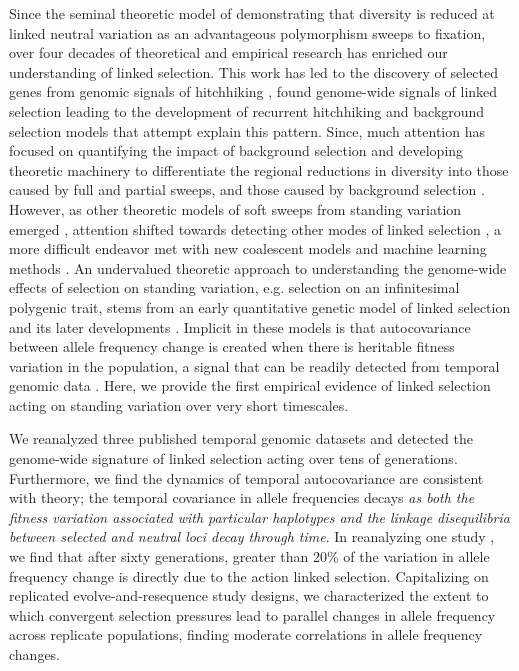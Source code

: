 \documentclass[11pt]{article}
\newcommand{\vb}[1]{{\it \color{blue} #1}}
\begin{document}
Since the seminal theoretic model of \textcite{Maynard_Smith1974-lc}
demonstrating that diversity is reduced at linked neutral variation as an
advantageous polymorphism sweeps to fixation, over four decades of theoretical
and empirical research has enriched our understanding of linked selection. This
work has led to the discovery of selected genes from genomic signals of
hitchhiking \parencite{Nair2003-tw,Voight2006-rn}, found genome-wide signals of
linked selection
\parencite{Aguade1989-jx,Begun1992-ey,Cutter2010-gi,Andersen2012-bj,Cutter2003-tl}
leading to the development of recurrent hitchhiking \parencite{Stephan1992-jc}
and background selection \parencite{Charlesworth1993-gb} models that attempt
explain this pattern. Since, much attention has focused on quantifying the
impact of background selection \parencite{McVicker2009-ax} and developing
theoretic machinery \parencite{Coop2012-cd} to differentiate the regional
reductions in diversity into those caused by full and partial sweeps, and those
caused by background selection \parencite{Elyashiv2016-vt}. However, as other
theoretic models of soft sweeps from standing variation emerged
\parencite{Hermisson2005-hs,Pennings2006-lj}, attention shifted towards
detecting other modes of linked selection \parencite{Pritchard2010-tk}, a more
difficult endeavor \parencite{Przeworski2005-bg} met with new coalescent models
\parencite{Berg2015-xj} and machine learning methods
\parencite{Schrider2017-yx}. An undervalued theoretic approach to understanding
the genome-wide effects of selection on standing variation, e.g. selection on
an infinitesimal polygenic trait, stems from an early quantitative genetic
model of linked selection \parencite{Robertson1961-ho} and its later
developments \parencite{Santiago1995-hx,Santiago1998-bs}. Implicit in these
models is that autocovariance between allele frequency change is created when
there is heritable fitness variation in the population, a signal that can be
readily detected from temporal genomic data \parencite{Buffalo2019-io}. Here,
we provide the first empirical evidence of linked selection acting on standing
variation over very short timescales.

We reanalyzed three published temporal genomic datasets and detected the
genome-wide signature of linked selection acting over tens of generations.
Furthermore, we find the dynamics of temporal autocovariance are consistent
with theory; the temporal covariance in allele frequencies decays \vb{as both
the fitness variation associated with particular haplotypes and the linkage
disequilibria between selected and neutral loci decay through time}. In
reanalyzing one study \parencite{Barghi2019-qy}, we find that after sixty
generations, greater than 20\% of the variation in allele frequency change is
directly due to the action linked selection. Capitalizing on replicated
evolve-and-resequence study designs, we characterized the extent to which
convergent selection pressures lead to parallel changes in allele frequency
across replicate populations, finding moderate correlations in allele frequency
changes.
\end{document}
